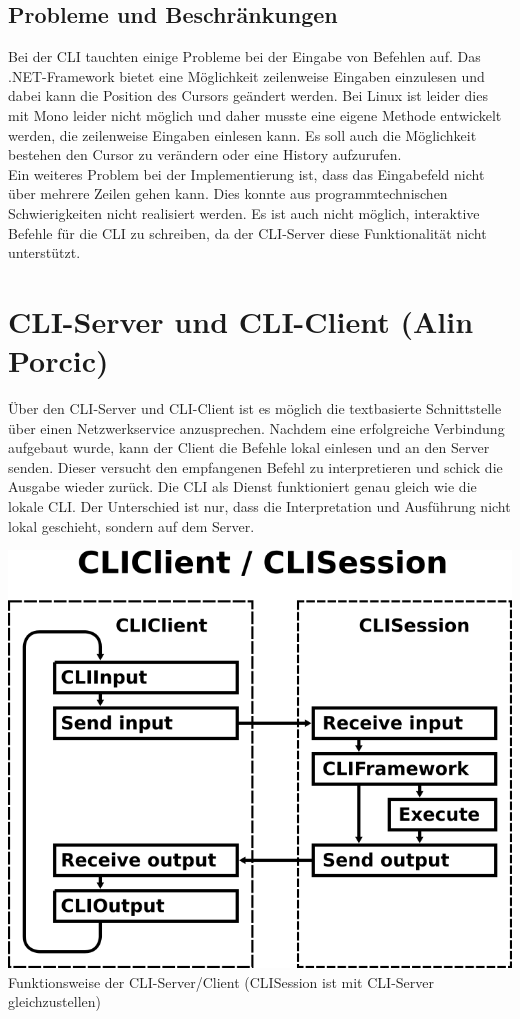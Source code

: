 \documentclass[12pt,a4paper]{report}
\begin{document}
\begin{onehalfspace}
\subsection{Probleme und Beschränkungen}

Bei der CLI tauchten einige Probleme bei der Eingabe von Befehlen auf. Das .NET-Framework bietet eine Möglichkeit zeilenweise Eingaben einzulesen und dabei kann die Position des Cursors geändert werden. Bei Linux ist leider dies mit Mono leider nicht möglich und daher musste eine eigene Methode entwickelt werden, die zeilenweise Eingaben einlesen kann. Es soll auch die Möglichkeit bestehen den Cursor zu verändern oder eine History aufzurufen.\\
Ein weiteres Problem bei der Implementierung ist, dass das Eingabefeld nicht über mehrere Zeilen gehen kann. Dies konnte aus programmtechnischen Schwierigkeiten nicht realisiert werden.
Es ist auch nicht möglich, interaktive Befehle für die CLI zu schreiben, da der CLI-Server diese Funktionalität nicht unterstützt.

\section{CLI-Server und CLI-Client (Alin Porcic)}

Über den CLI-Server und CLI-Client ist es möglich die textbasierte Schnittstelle über einen Netzwerkservice anzusprechen. Nachdem eine erfolgreiche Verbindung aufgebaut wurde, kann der Client die Befehle lokal einlesen und an den Server senden. Dieser versucht den empfangenen Befehl zu interpretieren und schick die Ausgabe wieder zurück. Die CLI als Dienst funktioniert genau gleich wie die lokale CLI. Der Unterschied ist nur, dass die Interpretation und Ausführung nicht lokal geschieht, sondern auf dem Server. 

\begin{center}
\includegraphics[scale=2.0]{img/mad_client_session.png}\\
Funktionsweise der CLI-Server/Client (CLISession ist mit CLI-Server gleichzustellen)
\end{center}


\end{onehalfspace}
\end{document}
